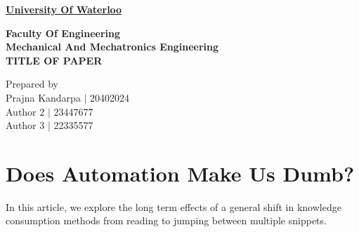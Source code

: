 \documentclass[10pt,oneside,final]{report}
\begin{document}
	\pagestyle{empty}

	\begin{titlepage}
	        \begin{center}

	        \Large
	        {\bf \sc \underline{University Of Waterloo}}
	        
	        \normalsize
	        {\bf \sc Faculty Of Engineering \\
	        Mechanical And Mechatronics Engineering} \\

	        \vspace*{1.0cm}
	        \Large
	        {\bf \uppercase{Title of paper}}
	        
	        \vspace*{1.5cm}
	        

	        \vspace*{1cm}
	        Prepared by\\
	        {\sc Prajna Kandarpa $\vert$ 20402024 \\
	        Author 2 $\vert$ 23447677 \\
	        Author 3 $\vert$ 22335577 }

	        \end{center}
	\end{titlepage}
	\linespread{1.0}
    \pagestyle{plain}
    \setcounter{page}{2}
    \renewcommand\contentsname{Table of Contents}
    \tableofcontents
    \cleardoublepage
    
    \listoftables
    \cleardoublepage
    \newpage
    
    \listoffigures
    \cleardoublepage



	\pagestyle{fancy}
\chapter{Does Automation Make Us Dumb?} %
\label{sec:section_name}
    In this article, we explore the long term effects of a general shift in knowledge 
    consumption methods from reading to jumping between multiple snippets.

\end{document}
